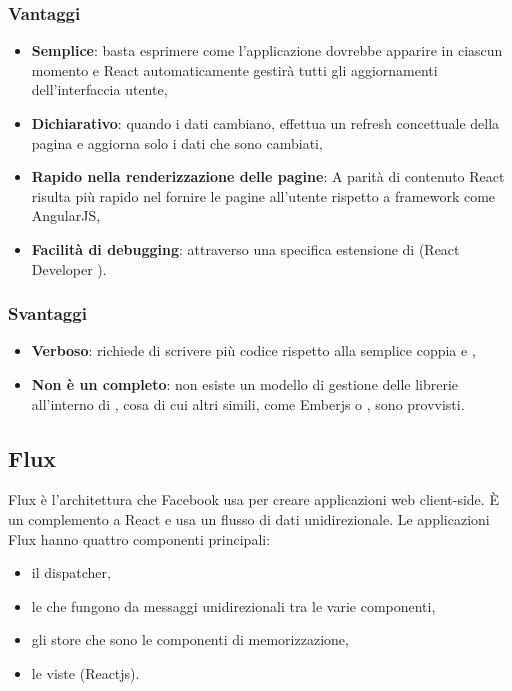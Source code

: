 \subsubsection{Vantaggi}
\begin{itemize}
\item \textbf{Semplice}: basta esprimere come l'applicazione dovrebbe apparire in ciascun momento e React automaticamente gestir\`a tutti gli aggiornamenti dell'interfaccia utente,
\item \textbf{Dichiarativo}: quando i dati cambiano,  effettua un refresh concettuale della pagina e aggiorna solo i dati che sono cambiati,
\item \textbf{Rapido nella renderizzazione delle pagine}: A parità di contenuto React risulta più rapido nel fornire le pagine all'utente rispetto a framework come AngularJS,
\item \textbf{Facilit\`a di debugging}: attraverso una specifica estensione di  (React Developer ).
\end{itemize}
\subsubsection{Svantaggi}
\begin{itemize}
\item \textbf{Verboso}: richiede di scrivere pi\`u codice rispetto alla semplice coppia  e ,
\item \textbf{Non \`e un  completo}: non esiste un modello di gestione delle librerie all'interno di , cosa di cui altri  simili, come Emberjs o , sono provvisti.
\end{itemize}

\subsection{Flux}
Flux è l'architettura che Facebook usa per creare applicazioni web client-side. È un complemento a React e usa un flusso di dati unidirezionale. Le applicazioni Flux hanno quattro componenti principali: 
\begin{itemize}
\item il dispatcher, 
\item le  che fungono da messaggi unidirezionali tra le varie componenti,
\item gli store che sono le componenti di memorizzazione,
\item le viste (Reactjs).
\end{itemize}


